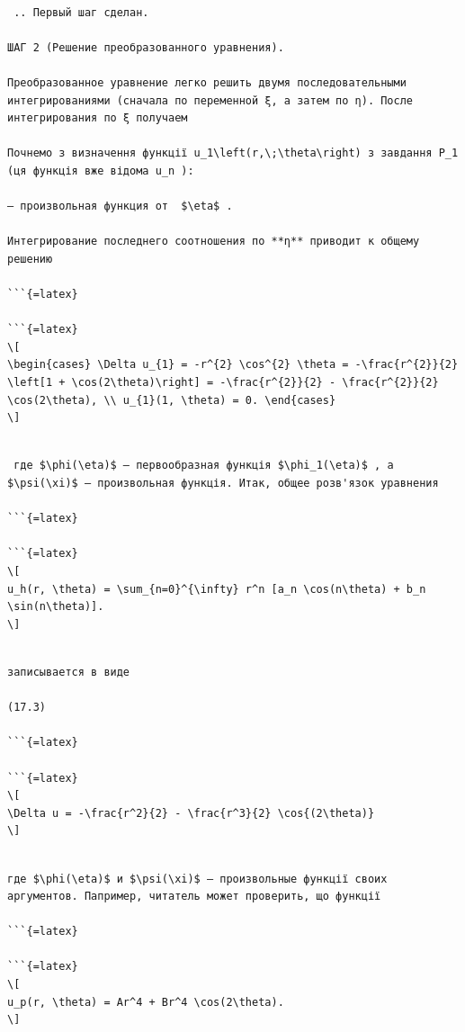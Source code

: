 \documentclass[
  ukrainian,
]{article}
\begin{document}
\begin{verbatim}

 .. Первый шаг сделан.

ШАГ 2 (Решение преобразованного уравнения).

Преобразованное уравнение легко решить двумя последовательными интегрированиями (сначала по переменной ξ, а затем по η). После интегрирования по ξ получаем

Почнемо з визначення функції u_1\left(r,\;\theta\right) з завдання P_1 (ця функція вже відома u_n ):

— произвольная функция от  $\eta$ .

Интегрирование последнего соотношения по **η** приводит к общему решению

```{=latex}

```{=latex}
\[
\begin{cases} \Delta u_{1} = -r^{2} \cos^{2} \theta = -\frac{r^{2}}{2} \left[1 + \cos(2\theta)\right] = -\frac{r^{2}}{2} - \frac{r^{2}}{2} \cos(2\theta), \\ u_{1}(1, \theta) = 0. \end{cases}
\]
\end{verbatim}

\begin{verbatim}

 где $\phi(\eta)$ — первообразная функція $\phi_1(\eta)$ , а $\psi(\xi)$ — произвольная функція. Итак, общее розв'язок уравнения

```{=latex}

```{=latex}
\[
u_h(r, \theta) = \sum_{n=0}^{\infty} r^n [a_n \cos(n\theta) + b_n \sin(n\theta)].
\]
\end{verbatim}

\begin{verbatim}

записывается в виде

(17.3)

```{=latex}

```{=latex}
\[
\Delta u = -\frac{r^2}{2} - \frac{r^3}{2} \cos{(2\theta)}
\]
\end{verbatim}

\begin{verbatim}

где $\phi(\eta)$ и $\psi(\xi)$ — произвольные функції своих аргументов. Папример, читатель может проверить, що функції

```{=latex}

```{=latex}
\[
u_p(r, \theta) = Ar^4 + Br^4 \cos(2\theta).
\]
\end{verbatim}
\end{document}

